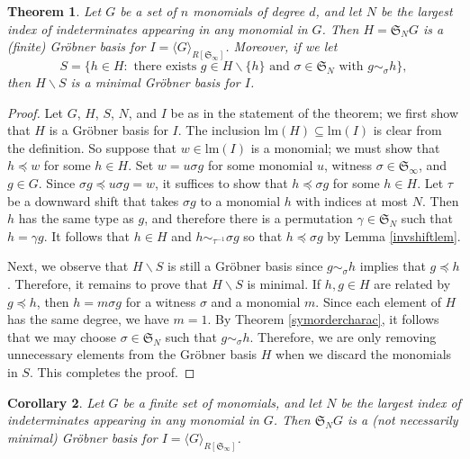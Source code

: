 \documentclass{amsart}
\newtheorem{theorem}{Theorem}[section]
\newtheorem{corollary}[theorem]{Corollary}
\theoremstyle{definition}
\theoremstyle{remark}
\numberwithin{equation}{section}
\newcommand{\<}{\langle}
\renewcommand{\>}{\rangle}
\begin{document}
\begin{theorem}\label{monGBprop}
Let $G$ be a set of $n$ monomials 
of degree $d$, and let $N$ be the largest index of indeterminates appearing
in any monomial in $G$.  Then $H = {\mathfrak S}_N G$ is a 
(finite) Gr\"obner basis for $I = \<G\>_{R[{\mathfrak S}_\infty]}$.
Moreover, if we let
\[S =\{ h \in H :  \text{ there exists $g  \in H \backslash \{h\}$ and  $\sigma \in 
{\mathfrak S}_N$ with $g \sim_{\sigma} h$}\},\] 
then $H \backslash S$ is a minimal Gr\"obner basis 
for $I$.
\end{theorem}
\begin{proof}
Let $G$, $H$, $S$, $N$, and $I$ be as in the statement of the theorem;  we first show that $H$ is a 
Gr\"obner basis for $I$. The inclusion $\text{lm}(H) \subseteq \text{lm}(I)$ is clear 
from the definition.  So suppose that $w \in \text{lm}(I)$ is a monomial; we must  show that 
$h \preceq w$ for some $h \in H$.  Set $w = u \sigma g$ for some monomial $u$, witness 
$\sigma \in {\mathfrak S}_\infty$, and $g \in G$.  Since  $\sigma g \preceq u\sigma g = w$,
it suffices to show that $h \preceq \sigma g$ for some $h \in H$.
Let $\tau$ be a downward shift that takes $\sigma g$ to a monomial $h$
with indices at most $N$.  Then $h$ has the same type as $g$, and
therefore there is a permutation $\gamma \in {\mathfrak S}_N$ such that
$h = \gamma g $. It follows that $h \in H$ and $h \sim_{\tau^{-1}} \sigma g$
so that $h \preceq \sigma g$ by Lemma \ref{invshiftlem}.

Next, we observe that $H \backslash S$ is still a Gr\"obner 
basis since $g \sim_{\sigma} h$ implies that $g \preceq h$.
Therefore, it remains to prove that $H \backslash S$ is minimal.
If $h,g \in H$ are related by $g \preceq h$, then $h = m \sigma g$ for 
a witness $\sigma$ and a monomial $m$.  Since each element of $H$
has the same degree, we have $m = 1$.  By Theorem \ref{symordercharac},
it follows that we may choose $\sigma \in {\mathfrak S}_N$ such that
$g \sim_{\sigma} h$.  Therefore, we are only removing unnecessary
elements from the Gr\"obner basis $H$ when we discard the monomials in
$S$. This completes the proof.
\end{proof}

\begin{corollary}
Let $G$ be a finite set of monomials, and let $N$ be the largest
index of indeterminates appearing in any monomial in $G$.  Then  ${\mathfrak S}_N G$
is a (not necessarily minimal) Gr\"obner basis for $I = \<G\>_{R[{\mathfrak S}_\infty]}$.
\end{corollary}
\end{document}

